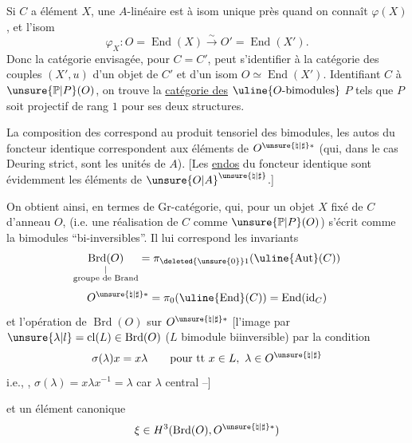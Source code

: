 Si $C$ a élément $X$, une   $A$-linéaire \deleted{\unsure{\varphi}}  est  à isom unique près quand on connaît  $\varphi(X)$, et l'isom
\[
\varphi_X:O=\operatorname{End}(X)\xrightarrow{\sim}O'=\operatorname{End}(X').
\]
Donc la catégorie envisagée, pour $C=C'$, peut s'identifier à la catégorie des couples $(X',u)$ d'un objet de $C'$ et d'un isom  $O\simeq\operatorname{End}(X')$.
Identifiant $C$ à $\unsure{\mathbb P|P}(O)$, on trouve la \uline{catégorie des} $\uline{O\text{-bimodules}}$ $P$ tels que $P$ soit projectif de rang $1$ pour ses deux structures.

La composition des   correspond au produit tensoriel des bimodules, les autos du foncteur identique correspondent aux éléments de $O^{\unsure{\natural|\sharp}*}$ (qui, dans le cas Deuring strict, sont les unités de $A$). [Les \uline{endos} du foncteur identique sont évidemment les éléments de $\unsure{O|A}^{\unsure{\natural|\sharp}}$.]

On obtient ainsi, en termes de   Gr-catégorie, qui, pour un objet $X$ fixé de $C$ d'anneau $O$, (i.e. une réalisation de $C$ comme $\unsure{\mathbb P|P}(O)$) s'écrit comme la   bimodules ``bi-inversibles''. Il lui correspond les invariants
\[
\underset{\substack{|\\\text{groupe de Brand}}}{\operatorname{Brd}(O)}
=\pi_{\deleted{\unsure{0}}1}(\uline{\operatorname{Aut}}(C))
\]
\[
O^{\unsure{\natural|\sharp}*}=\pi_0(\uline{\operatorname{End}}(C))=\operatorname{End}(\operatorname{id}_C)
\]
et  l'opération  de $\operatorname{Brd}(O)$ sur $O^{\unsure{\natural|\sharp}*}$   [l'image \inserted{$\sigma(\lambda)$} par $\unsure{\lambda|l}=\operatorname{cl}(L)\in\operatorname{Brd}(O)$  ($L$ bimodule biinversible)   par la condition
\[
\sigma(\lambda)x=x\lambda\qquad\text{pour tt }x\in L,\ \lambda\in O^{\unsure{\natural|\sharp}}
\]
i.e., , $\sigma(\lambda)=x\lambda x^{-1}=\lambda$ car $\lambda$ central --]

et un élément canonique
\[
\xi\in H^3(\operatorname{Brd}(O),O^{\unsure{\natural|\sharp}*})
\]

